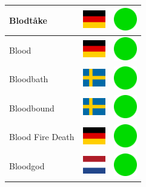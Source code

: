 \documentclass[12pt, a4paper, twoside]{report}
\begin{document}
\begin{center}
\begin{longtable}{|p{5cm}|p{2cm}|p{2cm}|}
 Blodtåke                                                   & \includegraphics[width=1cm]{../img/flags/de} &   \includegraphics[width=1cm]{../likes/y} \\ \hline
 Blood                                                      & \includegraphics[width=1cm]{../img/flags/de} &   \includegraphics[width=1cm]{../likes/y} \\ \hline
 Bloodbath                                                  & \includegraphics[width=1cm]{../img/flags/se} &   \includegraphics[width=1cm]{../likes/y} \\ \hline
 Bloodbound                                                 & \includegraphics[width=1cm]{../img/flags/se} &   \includegraphics[width=1cm]{../likes/y} \\ \hline
 Blood Fire Death                                           & \includegraphics[width=1cm]{../img/flags/de} &   \includegraphics[width=1cm]{../likes/y} \\ \hline
 Bloodgod                                                   & \includegraphics[width=1cm]{../img/flags/nl} &   \includegraphics[width=1cm]{../likes/y} \\ \hline

\end{longtable}
\end{center}
\end{document}
